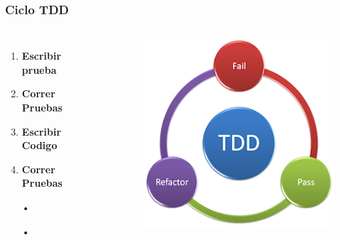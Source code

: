 \documentclass{beamer}
\begin{document}
\begin{frame}
\frametitle{Ciclo TDD}
\begin{columns}[c] %

\begin{enumerate}
\item \textbf{Escribir prueba}
\item {\color{red}\textbf{Correr Pruebas}}
\item \textbf{Escribir Codigo}
\item {\color{green}\textbf{Correr Pruebas}}
\item[•]	
\item[•]	
\end{enumerate}

\begin{figure}
\includegraphics[width=0.9\linewidth]{tdd.png}
\end{figure}
\end{columns}
\end{frame}
\end{document}
